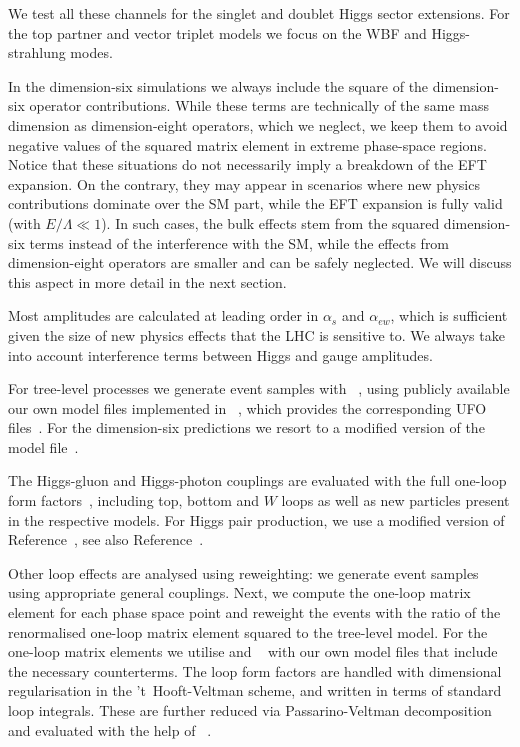 \newparagraph
%
We test all these channels for the singlet and doublet Higgs sector
extensions. For the top partner and vector triplet models we focus on
the WBF and Higgs-strahlung modes.

In the dimension-six simulations we always include the square of the
dimension-six operator contributions. While these terms are
technically of the same mass dimension as dimension-eight operators,
which we neglect, we keep them to avoid negative values of the squared
matrix element in extreme phase-space regions. Notice that these
situations do not necessarily imply a breakdown of the EFT
expansion. On the contrary, they may appear in scenarios where new
physics contributions dominate over the SM part, while the EFT
expansion is fully valid (with $E/\Lambda \ll 1$). In such cases, the
bulk effects stem from the squared dimension-six terms instead of the
interference with the SM, while the effects from dimension-eight
operators are smaller and can be safely neglected. We will discuss
this aspect in more detail in the next section.

Most amplitudes are calculated at leading order in $\alpha_s$
and $\alpha_{ew}$, which is sufficient given the size of new physics
effects that the LHC is sensitive to. We always take into account
interference terms between Higgs and gauge amplitudes. 

For tree-level processes we generate event samples with
~\cite{Alwall:2014hca}, using publicly available
our own model files implemented in
~\cite{Alloul:2013bka}, which provides the
corresponding UFO files~\cite{Degrande:2011ua}.  For the dimension-six
predictions we resort to a modified version of the 
model file~\cite{Alloul:2013naa}.

The Higgs-gluon and Higgs-photon couplings are evaluated with the full
one-loop form fac\-tors~\cite{Djouadi:2005gi}, including top, bottom and
$W$ loops as well as new particles present in the respective
models. For Higgs pair production, we use a modified version of
Reference~\cite{higgspaircode}, see also Reference~\cite{Hespel:2014sla}.

Other loop effects are analysed using reweighting: we generate event
samples using appropriate general couplings. Next, we compute the
one-loop matrix element for each phase space point and reweight the
events with the ratio of the renormalised one-loop matrix element
squared to the tree-level model. For the one-loop matrix elements we
utilise  and ~\cite{Hahn:2000kx}
with our own model files that include the necessary counterterms. The
loop form factors are handled with dimensional regularisation in the
't~Hooft-Veltman scheme, and written in terms of standard loop
integrals. These are further reduced via Passarino-Veltman
decomposition and evaluated with the help of
~\cite{Hahn:1998yk}.

